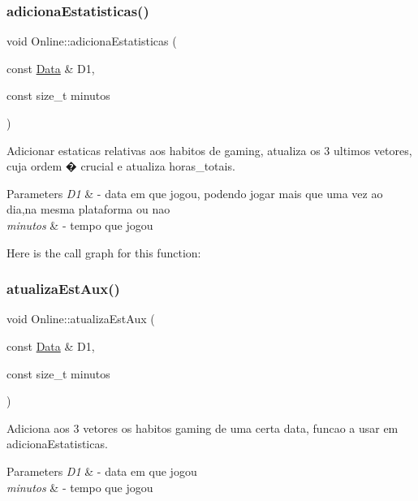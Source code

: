 \subsubsection{\texorpdfstring{adiciona\+Estatisticas()}{adicionaEstatisticas()}}
{\footnotesize\ttfamily void Online\+::adiciona\+Estatisticas (\begin{DoxyParamCaption}\item[{const \mbox{\hyperlink{class_data}{Data}} \&}]{D1,  }\item[{const size\+\_\+t}]{minutos }\end{DoxyParamCaption})}



Adicionar estaticas relativas aos habitos de gaming, atualiza os 3 ultimos vetores, cuja ordem � crucial e atualiza horas\+\_\+totais. 


\begin{DoxyParams}{Parameters}
{\em D1} & -\/ data em que jogou, podendo jogar mais que uma vez ao dia,na mesma plataforma ou nao \\
\hline
{\em minutos} & -\/ tempo que jogou \\
\hline
\end{DoxyParams}
Here is the call graph for this function\+:
\mbox{\label{class_online_a1796bfbb1c3210f26ca8e1cddc61d830}} 
\subsubsection{\texorpdfstring{atualiza\+Est\+Aux()}{atualizaEstAux()}}
{\footnotesize\ttfamily void Online\+::atualiza\+Est\+Aux (\begin{DoxyParamCaption}\item[{const \mbox{\hyperlink{class_data}{Data}} \&}]{D1,  }\item[{const size\+\_\+t}]{minutos }\end{DoxyParamCaption})}



Adiciona aos 3 vetores os habitos gaming de uma certa data, funcao a usar em adiciona\+Estatisticas. 


\begin{DoxyParams}{Parameters}
{\em D1} & -\/ data em que jogou \\
\hline
{\em minutos} & -\/ tempo que jogou \\
\hline
\end{DoxyParams}
\mbox{\label{class_online_aa6f51a948cb5ffd2c7cbac1f1cd6023f}} 
